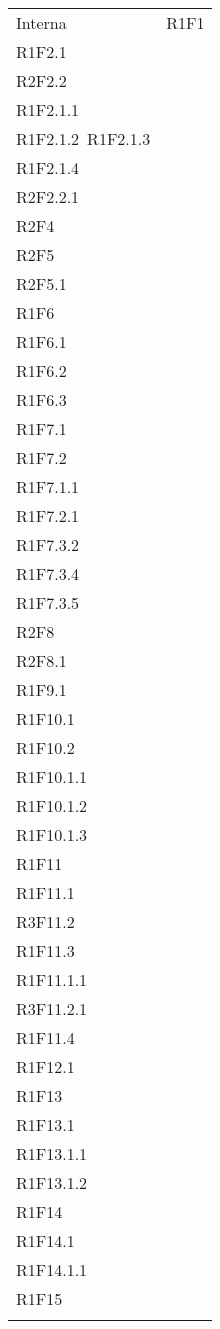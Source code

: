 \begin{longtable}{|C{6.5cm}|C{6.5cm}|}
	Interna &
	\centering
	R1F1\\
	R1F2.1 \\
	R2F2.2\\
	R1F2.1.1\\
	R1F2.1.2\
	R1F2.1.3\\
	R1F2.1.4\\
	R2F2.2.1\\
	R2F4\\
	R2F5\\
	R2F5.1\\
	R1F6\\
	R1F6.1\\
	R1F6.2\\
	R1F6.3\\
	R1F7.1\\
	R1F7.2\\
	R1F7.1.1\\
	R1F7.2.1\\
	R1F7.3.2\\
	R1F7.3.4\\
	R1F7.3.5\\
	R2F8\\
	R2F8.1\\
	R1F9.1\\
	R1F10.1\\
	R1F10.2\\
	R1F10.1.1\\
	R1F10.1.2\\
	R1F10.1.3\\
	R1F11\\
	R1F11.1\\
	R3F11.2\\
	R1F11.3\\
	R1F11.1.1\\
	R3F11.2.1\\
	R1F11.4\\
	R1F12.1\\
	R1F13\\
	R1F13.1\\
	R1F13.1.1\\
	R1F13.1.2\\
	R1F14\\
	R1F14.1\\
	R1F14.1.1\\
	R1F15\\

	\tabularnewline


\end{longtable}
